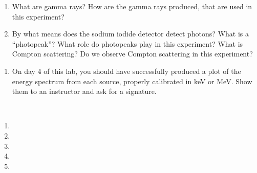 \documentclass{../signatures}
\begin{document}
\maketitle

\names

\gmasafty

\prelab

\begin{enumerate}
    \item What are gamma rays? How are the gamma rays produced, that are used in this experiment?
    \item By what means does the sodium iodide detector detect photons? What is a ``photopeak''? What role do photopeaks play in this experiment? What is Compton scattering? Do we observe Compton scattering in this experiment?
    \\[32pt]
\end{enumerate}

\prelabsignatures

\midlab

\begin{enumerate}
    \item On day 4 of this lab, you should have successfully produced a plot of the energy spectrum from each source, properly calibrated in keV or MeV. Show them to an instructor and ask for a signature.
    \\[32pt]
\end{enumerate}


\checkpointsection 
\\[24pt]
\begin{enumerate}

\item {}

\item {}

\item {}

\item {}

\item {}

\end{enumerate}
\end{document}
